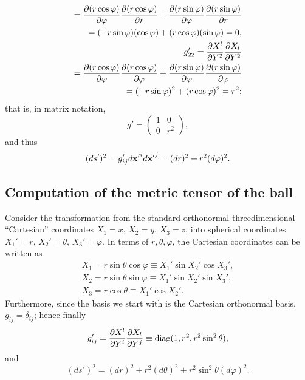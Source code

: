 {\begin{equation}
\begin{split}
=
{\partial (r \cos \varphi) \over \partial {\varphi }}{\partial (r \cos \varphi) \over \partial {r}}
+
{\partial (r \sin \varphi) \over \partial {\varphi }}{\partial (r \sin \varphi) \over \partial {r}}   \\
=
(- r \sin \varphi ) ( \cos \varphi )
+
( r\cos  \varphi )( \sin \varphi )  =0,\\
g'_{22}
= {\partial {X}^l\over \partial { Y }^2}{\partial {X}_l\over \partial { Y }^2} \\
=
{\partial (r \cos \varphi) \over \partial {\varphi}}{\partial (r \cos \varphi) \over \partial {\varphi }}
+
{\partial (r \sin \varphi) \over \partial {\varphi}}{\partial (r \sin \varphi) \over \partial {\varphi }}      \\
=
(- r \sin \varphi )^2
+
( r \cos \varphi )^2  =r^2;
\end{split}
\end{equation}
that is, in matrix notation,
\begin{equation}
g'
=
\begin{pmatrix}
1&0\\
0&r^2
\end{pmatrix}
,
\end{equation}
and thus
\begin{equation}
(d s')^2  = g_{ij}'d{\bf x'}^i d{\bf x'}^j=   (dr)^2 + r^2 (d\varphi )^2.
\label{2014-gppolarc}
\end{equation}







\subsection*{Computation of the metric tensor of the ball}
Consider the transformation from the standard orthonormal
threedimensional ``Cartesian'' coordinates
$X_1=x$,
$X_2=y$,
$X_3=z$,
into spherical coordinates
$X_1'=r$,
$X_2'=\theta$,
$X_3'=\varphi$.
In terms of  $r,\theta , \varphi$, the Cartesian coordinates can be written as
\begin{equation}
\begin{split}
 X_1=r \sin \theta \cos \varphi \equiv X_1' \sin X_2' \cos X_3'  , \\
 X_2=r \sin \theta \sin \varphi \equiv X_1'\sin X_2' \sin X_3'  ,    \\
 X_3=r \cos \theta  \equiv X_1'\cos X_2'  .
\end{split}
\end{equation}
Furthermore,  since the basis we start with is the Cartesian orthonormal basis,
$g_{ij}=\delta_{ij}$; hence finally
\begin{equation}
g'_{ij}= {\partial {X}^l\over \partial { Y }^i}{\partial {X}_l\over \partial { Y }^j}
\equiv {\rm diag}(1,r^2,r^2\sin^2 \theta ),
\end{equation}
and
\begin{equation}
(ds')^2 =(dr)^2+r^2(d\theta )^2+r^2\sin^2 \theta (d\varphi )^2.
\end{equation}

}
